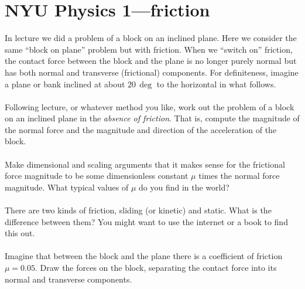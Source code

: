 \documentclass[12pt]{article}
\begin{document}
\sloppy\sloppypar\raggedbottom\frenchspacing\thispagestyle{empty}

\section*{NYU Physics 1---friction}

In lecture we did a problem of a block on an inclined plane.
Here we consider the same ``block on plane'' problem but with
friction.  When we ``switch on'' friction, the contact force between
the block and the plane is no longer purely normal but has both normal
and transverse (frictional) components.  For definiteness, imagine a
plane or bank inclined at about $20\,\deg$ to the horizontal in what
follows.

\paragraph{\theproblem}%
Following lecture, or whatever method you like, work out the problem
of a block on an inclined plane in the \emph{absence of friction}.
That is, compute the magnitude of the normal force and the magnitude
and direction of the acceleration of the block.

\paragraph{\theproblem}%
Make dimensional and scaling arguments that it makes sense for the
frictional force magnitude to be some dimensionless constant $\mu$
times the normal force magnitude. What typical values of $\mu$ do you
find in the world?

\paragraph{\theproblem}%
There are two kinds of friction, sliding (or kinetic) and static. What
is the difference between them? You might want to use the internet or
a book to find this out.

\paragraph{\theproblem}%
Imagine that between the block and the plane there is a coefficient of
friction $\mu=0.05$.  Draw the forces on the block, separating the
contact force into its normal and transverse components.
\end{document}
